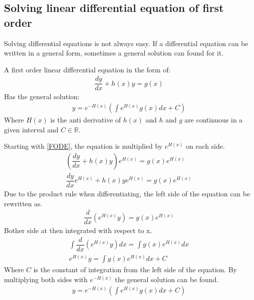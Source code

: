 \subsection{Solving linear differential equation of first order}
Solving differential equations is not always easy. If a differential equation can be written in a general form, sometimes a general solution can found for it.
\begin{tcolorbox}[colback=green!5!white,colframe=green!40!black,title=Theorem 2.1: General solution to a linear differential equation of the first order]
A first order linear differential equation in the form of:
\begin{align} \label{FODE_form}
\dfrac{dy}{dx}+h(x)y=g(x)
\end{align}
Has the general solution:
\begin{align} \label{FODE_solution}
y=e^{-H(x)}\left(\int e^{H(x)}g(x)dx+C\right)
\end{align}
Where $H(x)$ is the anti derivative of $h(x)$ and $h$ and $g$ are continuous in a given interval and $C\in \mathbb{R}$.
\end{tcolorbox}
\begin{tcolorbox}[colback=gray!5!white,colframe=gray!!black,title=Proof 2.1]
Starting with \eqref{FODE}, the equation is multiplied by $e^{H(x)}$ on each side.
\begin{align*}
\left(\dfrac{dy}{dx}+h(x)y\right)e^{H(x)}=g(x)e^{H(x)}
\\
\dfrac{dy}{dx}e^{H(x)}+h(x)ye^{H(x)}=g(x)e^{H(x)}
\end{align*}
Due to the product rule when differentiating, the left side of the equation can be rewritten as.
\begin{align*}
\dfrac{d}{dx}\left(e^{H(x)}y\right)=g(x)e^{H(x)}
\end{align*}
Bother side at then integrated with respect to x.
\begin{align*}
\int\dfrac{d}{dx}\left(e^{H(x)}y\right)dx=\int g(x)e^{H(x)}dx
\\
e^{H(x)}y=\int g(x)e^{H(x)}dx+C
\end{align*}
Where $C$ is the constant of integration from the left side of the  equation. By multiplying both sides with $e^{-H(x)}$ the general solution can be found.
\begin{align}
y=e^{-H(x)}\left(\int e^{H(x)}g(x)dx+C\right)
\end{align}
\end{tcolorbox}

